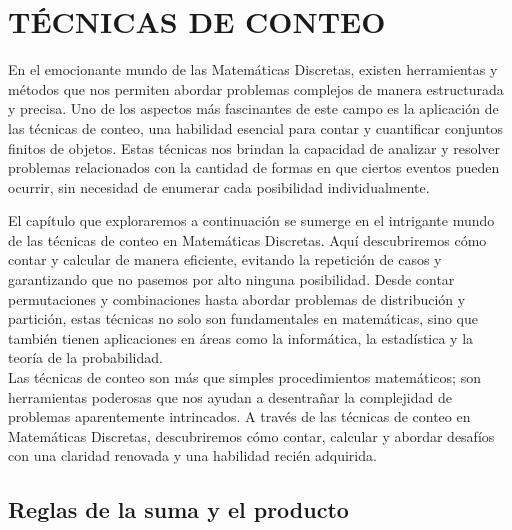 \chapterspaceabove{6.75cm} %
\chapterspacebelow{7.25cm} %


\chapter{TÉCNICAS DE CONTEO}\label{chap:2}


En el emocionante mundo de las Matemáticas Discretas, existen herramientas y métodos que nos permiten abordar problemas complejos de manera estructurada y precisa. Uno de los aspectos más fascinantes de este campo es la aplicación de las técnicas de conteo, una habilidad esencial para contar y cuantificar conjuntos finitos de objetos. Estas técnicas nos brindan la capacidad de analizar y resolver problemas relacionados con la cantidad de formas en que ciertos eventos pueden ocurrir, sin necesidad de enumerar cada posibilidad individualmente.

El capítulo que exploraremos a continuación se sumerge en el intrigante mundo de las técnicas de conteo en Matemáticas Discretas. Aquí descubriremos cómo contar y calcular de manera eficiente, evitando la repetición de casos y garantizando que no pasemos por alto ninguna posibilidad. Desde contar permutaciones y combinaciones hasta abordar problemas de distribución y partición, estas técnicas no solo son fundamentales en matemáticas, sino que también tienen aplicaciones en áreas como la informática, la estadística y la teoría de la probabilidad.\\



Las técnicas de conteo son más que simples procedimientos matemáticos; son herramientas poderosas que nos ayudan a desentrañar la complejidad de problemas aparentemente intrincados. A través de las técnicas de conteo en Matemáticas Discretas, descubriremos cómo contar, calcular y abordar desafíos con una claridad renovada y una habilidad recién adquirida.


\section{Reglas de la suma y el producto}

